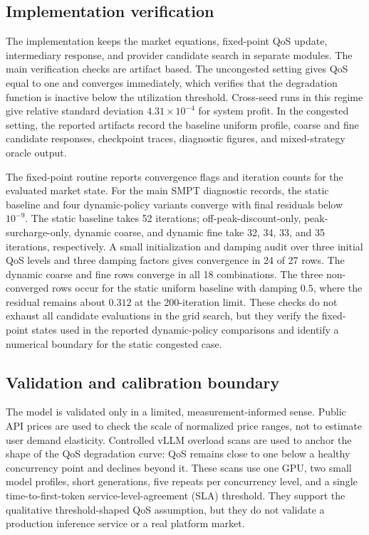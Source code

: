 \documentclass[11pt,a4paper]{article}
\begin{document}
\subsection{Implementation verification}

The implementation keeps the market equations, fixed-point QoS update, intermediary response, and provider candidate search in separate modules. The main verification checks are artifact based. The uncongested setting gives QoS equal to one and converges immediately, which verifies that the degradation function is inactive below the utilization threshold. Cross-seed runs in this regime give relative standard deviation $4.31\times10^{-4}$ for system profit. In the congested setting, the reported artifacts record the baseline uniform profile, coarse and fine candidate responses, checkpoint traces, diagnostic figures, and mixed-strategy oracle output.

The fixed-point routine reports convergence flags and iteration counts for the evaluated market state. For the main SMPT diagnostic records, the static baseline and four dynamic-policy variants converge with final residuals below $10^{-9}$. The static baseline takes 52 iterations; off-peak-discount-only, peak-surcharge-only, dynamic coarse, and dynamic fine take 32, 34, 33, and 35 iterations, respectively. A small initialization and damping audit over three initial QoS levels and three damping factors gives convergence in 24 of 27 rows. The dynamic coarse and fine rows converge in all 18 combinations. The three non-converged rows occur for the static uniform baseline with damping $0.5$, where the residual remains about $0.312$ at the 200-iteration limit. These checks do not exhaust all candidate evaluations in the grid search, but they verify the fixed-point states used in the reported dynamic-policy comparisons and identify a numerical boundary for the static congested case.

\subsection{Validation and calibration boundary}

The model is validated only in a limited, measurement-informed sense. Public API prices are used to check the scale of normalized price ranges, not to estimate user demand elasticity. Controlled vLLM overload scans are used to anchor the shape of the QoS degradation curve: QoS remains close to one below a healthy concurrency point and declines beyond it. These scans use one GPU, two small model profiles, short generations, five repeats per concurrency level, and a single time-to-first-token service-level-agreement (SLA) threshold. They support the qualitative threshold-shaped QoS assumption, but they do not validate a production inference service or a real platform market.
\end{document}
